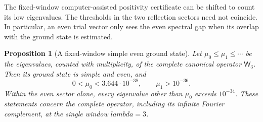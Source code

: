 \documentclass[11pt]{article}
\def\lambda{lambda}%
\newtheorem{proposition}[theorem]{Proposition}
\theoremstyle{remark}
\begin{document}
The fixed-window computer-assisted positivity certificate can be shifted to count its low
eigenvalues.  The thresholds in the two reflection sectors need not
coincide.  In particular, an even trial vector only sees the even spectral
gap when its overlap with the ground state is estimated.

\begin{proposition}[A fixed-window simple even ground state]
\label{prop:v117-ground-order}
Let $\mu_0\le\mu_1\le\cdots$ be the eigenvalues, counted with
multiplicity, of the complete canonical operator $\mathsf W_3$.
Then its ground state is simple and even, and
\begin{equation}\label{eq:v117-ground-order}
 0<\mu_0<3.644\cdot10^{-38},\qquad \mu_1>10^{-36}.
\end{equation}
Within the even sector alone, every eigenvalue other than $\mu_0$
exceeds $10^{-34}$.  These statements concern the complete operator,
including its infinite Fourier complement, at the single window
$\lambda=3$.
\end{proposition}
\end{document}
